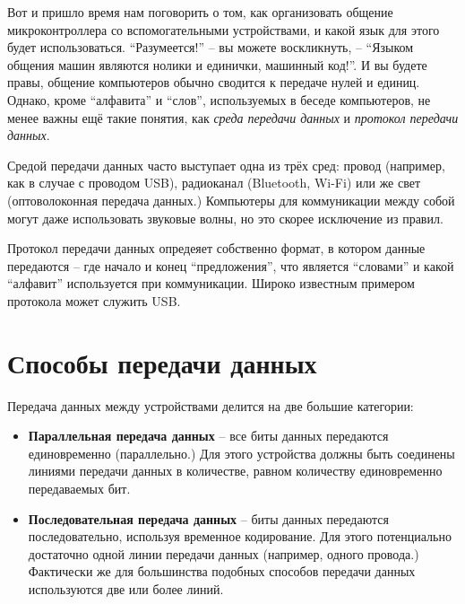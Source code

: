 \documentclass[../sparc.tex]{subfiles}
\begin{document}
Вот и пришло время нам поговорить о том, как организовать общение
микроконтроллера со вспомогательными устройствами, и какой язык для этого будет
использоваться.  ``Разумеется!'' -- вы можете воскликнуть, -- ``Языком общения
машин являются нолики и единички, машинный код!''.  И вы будете правы, общение
компьютеров обычно сводится к передаче нулей и единиц.  Однако, кроме
``алфавита'' и ``слов'', используемых в беседе компьютеров, не менее важны ещё
такие понятия, как \emph{среда передачи данных} и \emph{протокол передачи
данных}.

Средой передачи данных часто выступает одна из трёх сред: провод (например, как
в случае с проводом USB), радиоканал (Bluetooth, Wi-Fi) или же свет
(оптоволоконная передача данных.)  Компьютеры для коммуникации между собой могут
даже использовать звуковые волны, но это скорее исключение из правил.

Протокол передачи данных опредеяет собственно формат, в котором данные
передаются -- где начало и конец ``предложения'', что является ``словами'' и
какой ``алфавит'' используется при коммуникации.  Широко известным примером
протокола может служить USB.

\section{Способы передачи данных}


Передача данных между устройствами делится на две большие категории:

\begin{itemize}
\item \textbf{Параллельная передача данных} -- все биты данных передаются
  единовременно (параллельно.)  Для этого устройства должны быть соединены
  линиями передачи данных в количестве, равном количеству единовременно
  передаваемых бит.
\item \textbf{Последовательная передача данных} -- биты данных передаются
  последовательно, используя временное кодирование.  Для этого потенциально
  достаточно одной линии передачи данных (например, одного провода.)  Фактически
  же для большинства подобных способов передачи данных используются две или
  более линий.
\end{itemize}
\end{document}
